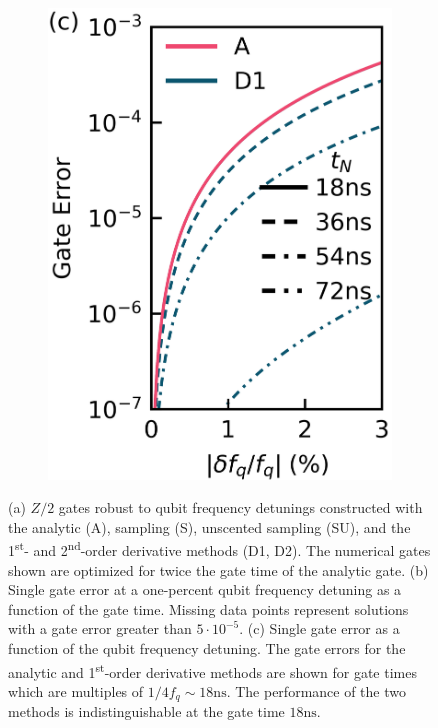 \begin{figure}[ht]
\begin{subfigure}{.4\textwidth}
    \caption{\label{fig:staticb}}
  \end{subfigure}\hfill
  \begin{subfigure}{.23\textwidth}
    \includegraphics[width=\linewidth]{assets/f2c.png}
    \caption{\label{fig:staticc}}
  \end{subfigure}
  \caption{
    (a) $Z/2$ gates robust to qubit frequency detunings constructed with the
    analytic (A), sampling (S), unscented sampling (SU), and the 1\textsuperscript{st}-
    and 2\textsuperscript{nd}-order derivative methods (D1, D2). The numerical gates shown
    are optimized for twice the gate time of the analytic gate.
    (b) Single gate error at a one-percent qubit frequency detuning as
    a function of the gate time. Missing
    data points represent solutions with a gate error greater than $5 \cdot 10^{-5}$.
    (c) Single gate error as a function of the qubit frequency detuning.
    The gate errors for the analytic and 1\textsuperscript{st}-order derivative
    methods are shown for gate times which are multiples of $1 / 4 f_{q} \sim 18 \textrm{ns}$.
    The performance of the two methods is
    indistinguishable at the gate time $18 \textrm{ns}$.
  }
  \label{fig:static}
\end{figure}

